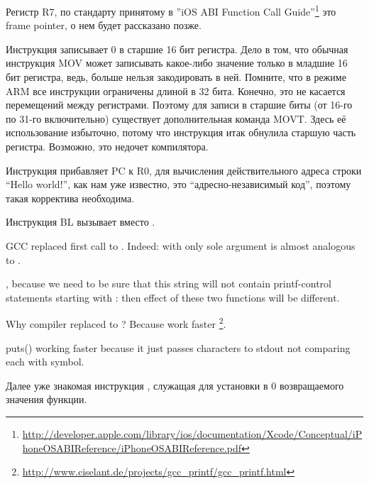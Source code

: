 Регистр R7, по стандарту принятому в ''iOS ABI Function Call Guide''\footnote{\url{http://developer.apple.com/library/ios/documentation/Xcode/Conceptual/iPhoneOSABIReference/iPhoneOSABIReference.pdf}} это frame pointer, о нем
будет рассказано позже.

Инструкция  записывает 0 в старшие 16 бит регистра. 
Дело в том, что обычная инструкция MOV может записывать какое-либо значение только в младшие 16 бит регистра, ведь, больше нельзя закодировать в ней. 
Помните, что в режиме ARM все инструкции ограничены длиной в 32 бита. Конечно, это не касается перемещений между регистрами.
Поэтому для записи в старшие биты (от 16-го по 31-го включительно) существует дополнительная команда MOVT.
Здесь её использование избыточно, потому что инструкция  итак обнулила старшую часть регистра. Возможно, это недочет компилятора.

Инструкция  прибавляет PC к R0, для вычисления действительного адреса строки 
``Hello world!'', как нам уже известно, это ``адресно-независимый код'', поэтому такая корректива необходима.

Инструкция BL вызывает  вместо \printf.

\label{puts}
{GCC replaced first \printf call to . 
Indeed: \printf with only sole argument is almost analogous to .} 

{, because we need to be sure that this string will not contain printf-control 
statements starting with \IT{\%}: then effect of these two functions will be different.}

{Why compiler replaced \printf to ? Because  work faster}
\footnote{\url{http://www.ciselant.de/projects/gcc_printf/gcc_printf.html}}. 

{puts() working faster because it just passes characters to stdout not comparing each with \IT{\%} symbol.}

Далее уже знакомая инструкция , служащая для установки в 0 возвращаемого значения функции.

